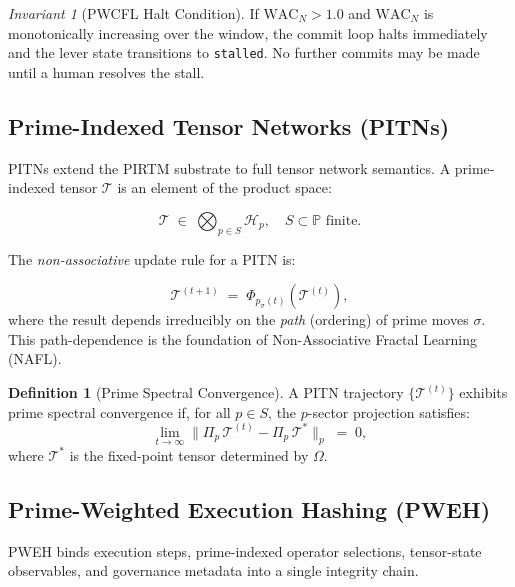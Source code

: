\documentclass[12pt,a4paper]{article}
\theoremstyle{definition}
\newtheorem{definition}{Definition}[section]
\theoremstyle{plain}
\theoremstyle{remark}
\newtheorem{invariant}{Invariant}[section]
\begin{document}
\begin{invariant}[PWCFL Halt Condition]
If $\mathrm{WAC}_N > 1.0$ and $\mathrm{WAC}_N$ is monotonically increasing
over the window, the commit loop halts immediately and the lever state
transitions to \texttt{stalled}. No further commits may be made until a
human resolves the stall.
\end{invariant}

\subsection{Prime-Indexed Tensor Networks (PITNs)}

PITNs extend the PIRTM substrate to full tensor network semantics. A
prime-indexed tensor $\mathcal{T}$ is an element of the product space:

\begin{equation}
  \mathcal{T} \;\in\; \bigotimes_{p \in S} \mathcal{H}_p,
  \quad S \subset \mathbb{P} \text{ finite.}
\end{equation}

The \emph{non-associative} update rule for a PITN is:

\begin{equation}
  \label{eq:pitn-update}
  \mathcal{T}^{(t+1)} \;=\;
  \Phi_{p_\sigma(t)}\!\left(\mathcal{T}^{(t)}\right),
\end{equation}
where the result depends irreducibly on the \emph{path} (ordering) of prime
moves $\sigma$. This path-dependence is the foundation of Non-Associative
Fractal Learning (NAFL).

\begin{definition}[Prime Spectral Convergence]
A PITN trajectory $\{\mathcal{T}^{(t)}\}$ exhibits prime spectral convergence
if, for all $p \in S$, the $p$-sector projection satisfies:
\begin{equation}
  \lim_{t\to\infty} \|\Pi_p\,\mathcal{T}^{(t)} - \Pi_p\,\mathcal{T}^*\|_p
  \;=\; 0,
\end{equation}
where $\mathcal{T}^*$ is the fixed-point tensor determined by $\Omega$.
\end{definition}

\subsection{Prime-Weighted Execution Hashing (PWEH)}

PWEH binds execution steps, prime-indexed operator selections, tensor-state
observables, and governance metadata into a single integrity chain.
\end{document}

